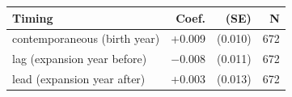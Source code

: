 \begin{tabular}{lrrr}
\toprule
Timing & Coef. & (SE) & N \\
\midrule
contemporaneous (birth year) & +0.009 & (0.010) & 672 \\
lag (expansion year before) & $-$0.008 & (0.011) & 672 \\
lead (expansion year after) & +0.003 & (0.013) & 672 \\
\bottomrule
\end{tabular}

